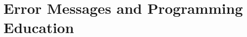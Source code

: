 \section{Error Messages and Programming Education} %
  \label{Error Messages and Programming Education} %


\todo






